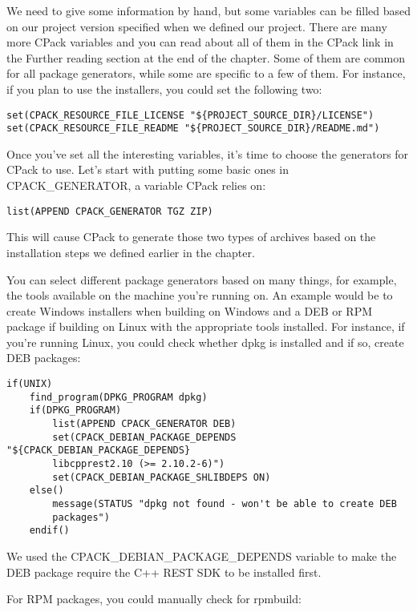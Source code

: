 We need to give some information by hand, but some variables can be filled based on our project version specified when we defined our project. There are many more CPack variables and you can read about all of them in the CPack link in the Further reading section at the end of the chapter. Some of them are common for all package generators, while some are specific to a few of them. For instance, if you plan to use the installers, you could set the following two:

\begin{lstlisting}[style=styleCMake]
set(CPACK_RESOURCE_FILE_LICENSE "${PROJECT_SOURCE_DIR}/LICENSE")
set(CPACK_RESOURCE_FILE_README "${PROJECT_SOURCE_DIR}/README.md")
\end{lstlisting}

Once you've set all the interesting variables, it's time to choose the generators for CPack to use. Let's start with putting some basic ones in CPACK\_GENERATOR, a variable CPack relies on:

\begin{lstlisting}[style=styleCMake]
list(APPEND CPACK_GENERATOR TGZ ZIP)
\end{lstlisting}

This will cause CPack to generate those two types of archives based on the installation steps we defined earlier in the chapter.

You can select different package generators based on many things, for example, the tools available on the machine you're running on. An example would be to create Windows installers when building on Windows and a DEB or RPM package if building on Linux with the appropriate tools installed. For instance, if you're running Linux, you could check whether dpkg is installed and if so, create DEB packages:

\begin{lstlisting}[style=styleCMake]
if(UNIX)
	find_program(DPKG_PROGRAM dpkg)
	if(DPKG_PROGRAM)
		list(APPEND CPACK_GENERATOR DEB)
		set(CPACK_DEBIAN_PACKAGE_DEPENDS "${CPACK_DEBIAN_PACKAGE_DEPENDS}
		libcpprest2.10 (>= 2.10.2-6)")
		set(CPACK_DEBIAN_PACKAGE_SHLIBDEPS ON)
	else()
		message(STATUS "dpkg not found - won't be able to create DEB
		packages")
	endif()
\end{lstlisting}

We used the CPACK\_DEBIAN\_PACKAGE\_DEPENDS variable to make the DEB package require the C++ REST SDK to be installed first.

For RPM packages, you could manually check for rpmbuild:

